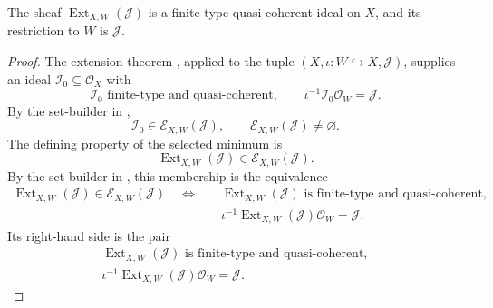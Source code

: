 \begin{lemma}
  \label{lemma:nagata-extend-finite-type-ideal}

  The sheaf $\operatorname{Ext}_{X,W}(\mathcal J)$ is a finite type
  quasi-coherent ideal on $X$, and its restriction to $W$ is
  $\mathcal J$.
\end{lemma}

\begin{proof}
  The extension theorem
  {\cite[\href{https://stacks.math.columbia.edu/tag/01PF}{Tag 01PF}]
  {stacks-project}}, applied to the tuple
  $(X,\iota\colon W\hookrightarrow X,\mathcal J)$, supplies an ideal
  $\mathcal I_0\subseteq\mathcal O_X$ with
  \[
    \mathcal I_0\text{ finite-type and quasi-coherent},
    \qquad
    \iota^{-1}\mathcal I_0\mathcal O_W=\mathcal J.
  \]
  By the set-builder in
  ,
  \[
    \mathcal I_0\in\mathscr E_{X,W}(\mathcal J),
    \qquad
    \mathscr E_{X,W}(\mathcal J)\ne\varnothing.
  \]
  The defining property of the selected minimum is
  \[
    \operatorname{Ext}_{X,W}(\mathcal J)
      \in\mathscr E_{X,W}(\mathcal J).
  \]
  By the set-builder in
  , this membership is the
  equivalence
  \[
  \begin{aligned}
    \operatorname{Ext}_{X,W}(\mathcal J)
      \in\mathscr E_{X,W}(\mathcal J)
    \quad\Longleftrightarrow\quad
    &\operatorname{Ext}_{X,W}(\mathcal J)
       \text{ is finite-type and quasi-coherent},\\
    &\iota^{-1}\operatorname{Ext}_{X,W}(\mathcal J)
       \mathcal O_W=\mathcal J.
  \end{aligned}
  \]
  Its right-hand side is the pair
  \[
  \begin{gathered}
    \operatorname{Ext}_{X,W}(\mathcal J)
       \text{ is finite-type and quasi-coherent},\\
    \iota^{-1}\operatorname{Ext}_{X,W}(\mathcal J)
       \mathcal O_W=\mathcal J.
  \end{gathered}
  \]
\end{proof}

